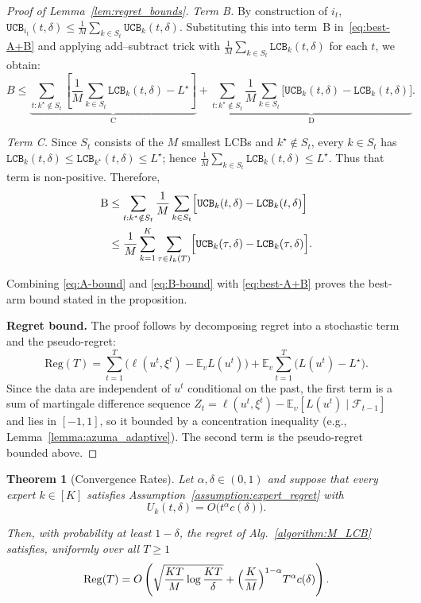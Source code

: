 \documentclass[a4paper,14pt]{extarticle}
\theoremstyle{plain}
\newtheorem{theorem}{Theorem}
\newcommand{\mbE}{\mathbb E}
\newcommand{\LCB}{\texttt{LCB}}
\newcommand{\UCB}{\texttt{UCB}}
\begin{document}
\begin{proof}[Proof of Lemma~\ref{lem:regret_bounds}]
\emph{Term B.}
By construction of $i_t$,
$\UCB_{i_t}(t, \delta) \le \frac{1}{M}\sum_{k\in S_t}\UCB_k(t, \delta)$.  Substituting this into term~B in~\eqref{eq:best-A+B}  and applying add–subtract trick with
$\frac{1}{M}\sum_{k \in S_t} \LCB_k(t, \delta)$ for each $t$,
we obtain:
\begin{equation*}
    B \leq \underbrace{\sum_{t: k^\star \notin S_t} \left[ {\frac{1}{M}\sum_{k \in S_t} \LCB_k(t, \delta)} - L^\star \right] }_{\text{C}}  +
    \underbrace{\sum_{t: k^\star \notin S_t} \frac{1}{M}\sum_{k \in S_t} \bigg[\UCB_k(t, \delta) - {\LCB_k(t, \delta)} \bigg] }_{\text{D} }.
\end{equation*}

\textit{Term C.} Since $S_t$ consists of the $M$ smallest LCBs and $k^\star\notin S_t$, every $k\in S_t$ has
$\LCB_k(t,\delta)\le \LCB_{k^\star}(t,\delta)\le L^\star$; hence $\frac{1}{M}\sum_{k\in S_t}\LCB_k(t,\delta)\le L^\star$.
Thus that term is non-positive. Therefore,
\begin{align}
\text{B}
&\le \sum_{t:k^\star\notin S_t}
\frac{1}{M}\sum_{k\in S_t}\Bigl[\UCB_k(t, \delta)-\LCB_k(t, \delta)\Bigr] \\
&\le  \frac{1}{M}\sum_{k=1}^{K}\sum_{\tau\in I_k(T)} \Bigl[\UCB_k(\tau, \delta)-\LCB_k(\tau, \delta)\Bigr].
\label{eq:B-bound}
\end{align}

Combining \eqref{eq:A-bound} and \eqref{eq:B-bound} with \eqref{eq:best-A+B} proves the best-arm bound stated in the proposition.

\textbf{Regret bound.} The proof follows by decomposing regret into a stochastic term and the pseudo-regret:
    \begin{equation*}
        \mathrm{Reg}(T) = \sum_{t=1}^T \bigg(\ell(u^t,\xi^t) - \mbE_v L(u^t)\bigg) + \mbE_v \sum_{t=1}^T \bigg(L(u^t) - L^\star\bigg).
    \end{equation*}
Since the data are independent of $u^t$ conditional on the past, the first term is a sum of martingale difference sequence $Z_t =\ell(u^t,\xi^t)-\mathbb E_{\upsilon}[L(u^t)\mid\mathcal F_{t-1}]$ and lies in $[-1,1]$, so it bounded by a concentration inequality (e.g., Lemma~\ref{lemma:azuma_adaptive}). The second term is the pseudo-regret bounded above.
\end{proof}


\begin{theorem}[Convergence Rates]
\label{thm:gen-rate}
Let $\alpha,\delta\in(0,1)$ and suppose that every expert $k\in[K]$ satisfies Assumption~\ref{assumption:expert_regret} with
\begin{equation*}
U_k(t,\delta)=O\bigl(t^{\alpha}c(\delta)\bigr).
\end{equation*}

Then, with probability at least $1-\delta$, the regret of Alg.~\ref{algorithm:M_LCB} satisfies, uniformly over all $T\ge 1$
\begin{equation*}
\mathrm{Reg}(T) = O\left(\sqrt{\frac{KT}{M}\log\frac{KT}{\delta}} + \Bigl(\frac{K}{M}\Bigr)^{1-\alpha}T^{\alpha}c(\delta)\right).
\end{equation*}
\end{theorem}
\end{document}

